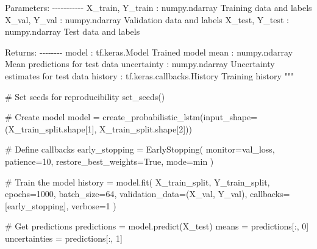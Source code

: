 \documentclass[
  letterpaper,
  DIV=11,
  numbers=noendperiod]{scrreprt}
\newenvironment{Shaded}{\begin{snugshade}}{\end{snugshade}}
\newcommand{\CommentTok}[1]{\textcolor[rgb]{0.37,0.37,0.37}{#1}}
\newcommand{\DecValTok}[1]{\textcolor[rgb]{0.68,0.00,0.00}{#1}}
\newcommand{\NormalTok}[1]{\textcolor[rgb]{0.00,0.23,0.31}{#1}}
\newcommand{\OperatorTok}[1]{\textcolor[rgb]{0.37,0.37,0.37}{#1}}
\newcommand{\StringTok}[1]{\textcolor[rgb]{0.13,0.47,0.30}{#1}}
\newcommand{\VariableTok}[1]{\textcolor[rgb]{0.07,0.07,0.07}{#1}}
\begin{document}
\begin{Shaded}
\begin{Highlighting}[]
\CommentTok{    Parameters:}
\CommentTok{    {-}{-}{-}{-}{-}{-}{-}{-}{-}{-}{-}}
\CommentTok{    X\_train, Y\_train : numpy.ndarray}
\CommentTok{        Training data and labels}
\CommentTok{    X\_val, Y\_val : numpy.ndarray}
\CommentTok{        Validation data and labels}
\CommentTok{    X\_test, Y\_test : numpy.ndarray}
\CommentTok{        Test data and labels}


\CommentTok{    Returns:}
\CommentTok{    {-}{-}{-}{-}{-}{-}{-}{-}}
\CommentTok{    model : tf.keras.Model}
\CommentTok{        Trained model}
\CommentTok{    mean : numpy.ndarray}
\CommentTok{        Mean predictions for test data}
\CommentTok{    uncertainty : numpy.ndarray}
\CommentTok{        Uncertainty estimates for test data}
\CommentTok{    history : tf.keras.callbacks.History}
\CommentTok{        Training history}
\CommentTok{    """}

    \CommentTok{\# Set seeds for reproducibility}
\NormalTok{    set\_seeds()}

    \CommentTok{\# Create model}
\NormalTok{    model }\OperatorTok{=}\NormalTok{ create\_probabilistic\_lstm(input\_shape}\OperatorTok{=}\NormalTok{(X\_train\_split.shape[}\DecValTok{1}\NormalTok{], X\_train\_split.shape[}\DecValTok{2}\NormalTok{]))}

    \CommentTok{\# Define callbacks}
\NormalTok{    early\_stopping }\OperatorTok{=}\NormalTok{ EarlyStopping(}
\NormalTok{        monitor}\OperatorTok{=}\StringTok{\textquotesingle{}val\_loss\textquotesingle{}}\NormalTok{,}
\NormalTok{        patience}\OperatorTok{=}\DecValTok{10}\NormalTok{,}
\NormalTok{        restore\_best\_weights}\OperatorTok{=}\VariableTok{True}\NormalTok{,}
\NormalTok{        mode}\OperatorTok{=}\StringTok{\textquotesingle{}min\textquotesingle{}}
\NormalTok{    )}

    \CommentTok{\# Train the model}
\NormalTok{    history }\OperatorTok{=}\NormalTok{ model.fit(}
\NormalTok{        X\_train\_split, Y\_train\_split,}
\NormalTok{        epochs}\OperatorTok{=}\DecValTok{1000}\NormalTok{,}
\NormalTok{        batch\_size}\OperatorTok{=}\DecValTok{64}\NormalTok{,}
\NormalTok{        validation\_data}\OperatorTok{=}\NormalTok{(X\_val, Y\_val),}
\NormalTok{        callbacks}\OperatorTok{=}\NormalTok{[early\_stopping],}
\NormalTok{        verbose}\OperatorTok{=}\DecValTok{1}
\NormalTok{    )}

    \CommentTok{\# Get predictions}
\NormalTok{    predictions }\OperatorTok{=}\NormalTok{ model.predict(X\_test)}
\NormalTok{    means }\OperatorTok{=}\NormalTok{ predictions[:, }\DecValTok{0}\NormalTok{]}
\NormalTok{    uncertainties }\OperatorTok{=}\NormalTok{ predictions[:, }\DecValTok{1}\NormalTok{]}


\end{Highlighting}
\end{Shaded}
\end{document}
